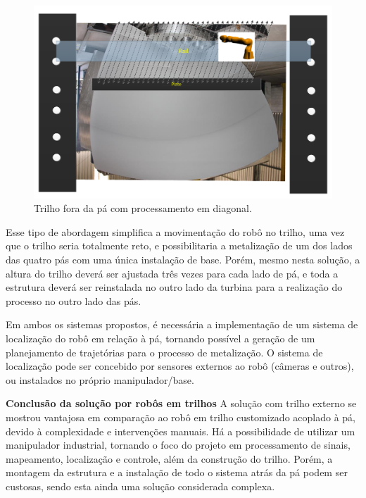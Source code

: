 \begin{figure}[h!]
\centering
	\includegraphics[width=\columnwidth]{figs/trilhos/rail2.pdf}
	\caption{Trilho fora da pá com processamento em diagonal.}
	\label{rail2}
\end{figure}

Esse tipo de abordagem simplifica a movimentação do robô no
trilho, uma vez que o trilho seria totalmente reto, e possibilitaria a
metalização de um dos lados das quatro pás com uma única instalação de base.
Porém, mesmo nesta solução, a altura do trilho deverá ser ajustada três vezes para
cada lado de pá, e toda a estrutura deverá ser reinstalada no outro lado da
turbina para a realização do processo no outro lado das pás.

Em ambos os sistemas propostos, é necessária a implementação de um sistema de
localização do robô em relação à pá, tornando possível a geração de um
planejamento de trajetórias para o processo de metalização. O sistema de
localização pode ser concebido por sensores externos
ao robô (câmeras e outros), ou instalados no próprio manipulador/base.

\textbf{Conclusão da solução por robôs em trilhos}
A solução com trilho externo se mostrou vantajosa em comparação ao robô em
trilho customizado acoplado à pá, devido à complexidade e intervenções
manuais. Há a possibilidade de utilizar um manipulador industrial, tornando o
foco do projeto em processamento de sinais, mapeamento, localização e controle,
além da construção do trilho. Porém, a montagem da estrutura e a instalação de
todo o sistema atrás da pá podem ser custosas, sendo esta ainda uma solução
considerada complexa.